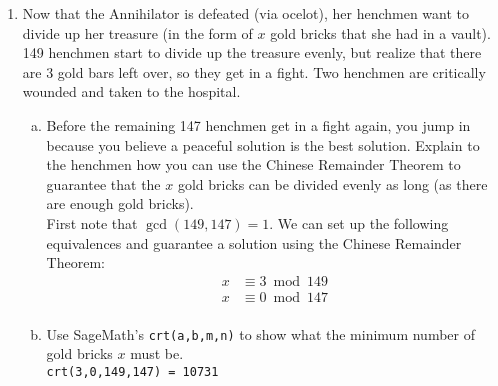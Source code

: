 \documentclass[12pt]{amsart}
\theoremstyle{plain}
\theoremstyle{definition}
\begin{document}
\begin{enumerate}[1.]
\begin{enumerate}[a.]
			
		\end{enumerate}
	\item Now that the Annihilator is defeated (via ocelot), her henchmen want to divide up her treasure (in the form of $x$ gold bricks that she had in a vault).  149 henchmen start to divide up the treasure evenly, but realize that there are 3 gold bars left over, so they get in a fight.  Two henchmen are critically wounded and taken to the hospital.\\
	\begin{enumerate}[a.]
	\item Before the remaining 147 henchmen get in a fight again, you jump in because you believe a peaceful solution is the best solution.  Explain to the henchmen how you can use the Chinese Remainder Theorem to guarantee that the $x$ gold bricks can be divided evenly as long (as there are enough gold bricks).\\
	First note that $\gcd(149,147) = 1	$.  We can set up the following equivalences and guarantee a solution using the Chinese Remainder Theorem:
	\begin{align*}
	x &\equiv 3 \bmod 149\\
	x &\equiv 0 \bmod 147\\
	\end{align*}
	
	\item Use SageMath's \texttt{crt(a,b,m,n)} to show what the minimum number of gold bricks $x$ must be.\\
	\texttt{crt(3,0,149,147) = 10731}
	\end{enumerate}
\end{enumerate}

	
\end{document}
